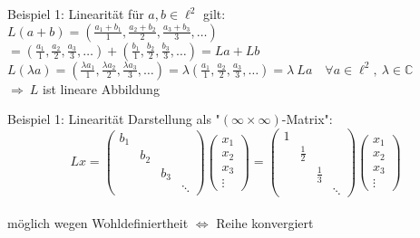 \documentclass[AERbeamer%
,optBeamerClassicFormat%
,optLeftEquations   %
]{AERlatex}
\begin{document}
%
    \begin{frame}{Beispiel 1: Linearität}
        \setlength{\baselineskip}{1.6\baselineskip}
        für $a, b \in \ell^2$ gilt: \\
        $L(a+b)=\left(\frac{a_1+b_1}{1}, \frac{a_2+b_2}{2}, \frac{a_3+b_3}{3}, \ldots\right)$ \\ \pause
        $=\left(\frac{a_1}{1}, \frac{a_2}{2}, \frac{a_3}{3}, \ldots\right)+\left(\frac{b_1}{1}, \frac{b_2}{2}, \frac{b_3}{3}, \ldots\right)=L a+L b$ \\ \pause
        $L(\lambda a)=\left(\frac{\lambda a_1}{1}, \frac{\lambda a_2}{2}, \frac{\lambda a_3}{3}, \ldots\right)=\lambda\left(\frac{a_1}{1}, \frac{a_2}{2}, \frac{a_3}{3}, \ldots\right)=\lambda ~ L a \quad \forall a \in \ell^{2}, ~\lambda \in \mathbb{C}$ \\ \pause
        $\Rightarrow ~ L$  ist lineare Abbildung
    \end{frame}
%
    \begin{frame}{Beispiel 1: Linearität}
        Darstellung als "$(\infty \times \infty)$-Matrix":
        \begin{equation*}
            Lx = \left(\begin{array}{llll}
                           b_1 &     &     &        \\
                           & b_2 &     &        \\
                           &     & b_3 &        \\
                           &     &     & \ddots
            \end{array}\right)
            \left(\begin{array}{c}
                      x_1 \\
                      x_2 \\
                      x_3 \\
                      \vdots
            \end{array}\right) =
            \left(\begin{array}{llll}
                      1 &             &             &        \\
                      & \frac{1}{2} &             &        \\
                      &             & \frac{1}{3} &        \\
                      &             &             & \ddots
            \end{array}\right)
            \left(\begin{array}{c}
                      x_1 \\
                      x_2 \\
                      x_3 \\
                      \vdots
            \end{array}\right)
        \end{equation*} \\
        möglich wegen Wohldefiniertheit $\Leftrightarrow$ Reihe konvergiert
    \end{frame}
\end{document}
